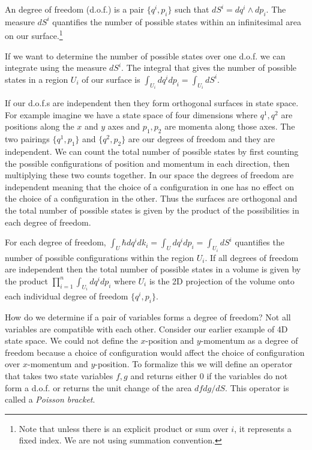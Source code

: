 \documentclass{article}
\begin{document}
\begin{defn}
	An degree of freedom (d.o.f.) is a pair $\{q^i,p_i \}$ such that $dS^i = dq^i \land dp_i$. The measure $dS^i$ quantifies the number of possible states within an infinitesimal area on our surface.\footnote{Note that unless there is an explicit product or sum over $i$, it represents a fixed index. We are not using summation convention.}
\end{defn}

	If we want to determine the number of possible states over one d.o.f. we can integrate using the measure $dS^i$. The integral that gives the number of possible states in a region $U_i$ of our surface is $\int_{U_i} dq^i dp_i = \int_{U_i} dS^i$.

	If our d.o.f.s are independent then they form orthogonal surfaces in state space. For example imagine we have a state space of four dimensions where $q^1,q^2$ are positions along the $x$ and $y$ axes and $p_1,p_2$ are momenta along those axes. The two pairings $\{q^1,p_1 \}$ and $\{q^2,p_2 \}$ are our degrees of freedom and they are independent. We can count the total number of possible states by first counting the possible configurations of position and momentum in each direction, then multiplying these two counts together. In our space the degrees of freedom are independent meaning that the choice of a configuration in one has no effect on the choice of a configuration in the other. Thus the surfaces are orthogonal and the total number of possible states is given by the product of the possibilities in each degree of freedom.

\begin{prop}
	For each degree of freedom, $\int_U \hbar dq^i dk_i = \int_U dq^i dp_i = \int_{U_i} dS^i$ quantifies the number of possible configurations within the region $U_i$. If all degrees of freedom are independent then the total number of possible states in a volume is given by the product ${\displaystyle \prod_{i=1}^{n}} \int_{U_i} dq^i dp_i$ where $U_i$ is the 2D projection of the volume onto each individual degree of freedom $\{q^i,p_i\}$.
\end{prop}

	How do we determine if a pair of variables forms a degree of freedom? Not all variables are compatible with each other. Consider our earlier example of 4D state space. We could not define the $x$-position and $y$-momentum as a degree of freedom because a choice of configuration would affect the choice of configuration over $x$-momentum and $y$-position. To formalize this we will define an operator that takes two state variables $f,g$ and returns either 0 if the variables do not form a d.o.f. or returns the unit change of the area $dfdg/dS$. This operator is called a \textit{Poisson bracket}.
\end{document}
